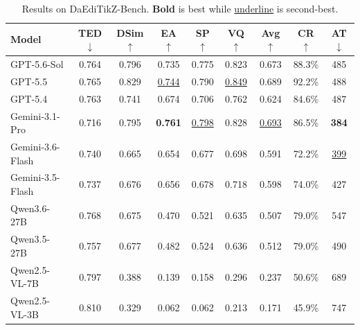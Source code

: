 \begin{table}[t]
\centering
\caption{Results on DaEdiTikZ-Bench. \textbf{Bold} is best while \underline{underline} is second-best.}
\label{tab:editikz_main}
\small
\setlength{\tabcolsep}{5pt}
\renewcommand{\arraystretch}{0.95}

\begin{tabular}{lccccc:c:cc}
\toprule

\textbf{Model} &
\textbf{TED}$\downarrow$ &
\textbf{DSim}$\uparrow$ &
\textbf{EA}$\uparrow$ &
\textbf{SP}$\uparrow$ &
\textbf{VQ}$\uparrow$ &
\textbf{Avg}$\uparrow$ &
\textbf{CR}$\uparrow$ &
\textbf{AT}$\downarrow$ \\
\midrule

GPT-5.6-Sol
& 0.764 & 0.796 & 0.735 & 0.775 & 0.823
& 0.673
& 88.3\% & 485 \\

GPT-5.5
& 0.765 & 0.829 & \underline{0.744} & 0.790 & \underline{0.849}
& 0.689
& 92.2\% & 488 \\

GPT-5.4
& 0.763 & 0.741 & 0.674 & 0.706 & 0.762
& 0.624
& 84.6\% & 487 \\

Gemini-3.1-Pro
& 0.716 & 0.795 & \textbf{0.761} & \underline{0.798} & 0.828
& \underline{0.693}
& 86.5\% & \textbf{384} \\

Gemini-3.6-Flash
& 0.740 & 0.665 & 0.654 & 0.677 & 0.698
& 0.591
& 72.2\% & \underline{399} \\

Gemini-3.5-Flash
& 0.737 & 0.676 & 0.656 & 0.678 & 0.718
& 0.598
& 74.0\% & 427 \\

\midrule

Qwen3.6-27B
& 0.768 & 0.675 & 0.470 & 0.521 & 0.635
& 0.507
& 79.0\% & 547 \\

Qwen3.5-27B
& 0.757 & 0.677 & 0.482 & 0.524 & 0.636
& 0.512
& 79.0\% & 490 \\

Qwen2.5-VL-7B
& 0.797 & 0.388 & 0.139 & 0.158 & 0.296
& 0.237
& 50.6\% & 689 \\

\midrule

Qwen2.5-VL-3B
& 0.810 & 0.329 & 0.062 & 0.062 & 0.213
& 0.171
& 45.9\% & 747 \\


\end{tabular}
\end{table}
